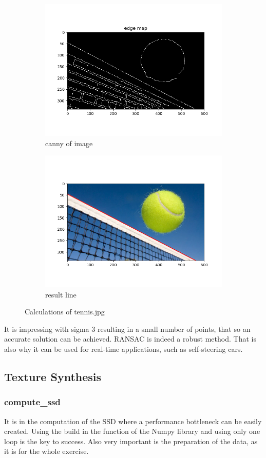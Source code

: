 \documentclass[12pt]{article}
\begin{document}
\begin{figure}[!htb]
  \vspace*{-1cm}
  \centering
  \begin{subfigure}{.5\textwidth}
    \centering
    \includegraphics[width=0.7\linewidth]{pics/hw3_ex_1_tennis_canny}
    \caption{canny of image}
  \end{subfigure}%
  \begin{subfigure}{.5\textwidth}
    \centering
    \includegraphics[width=0.7\linewidth]{pics/hw3_ex_1_tennis_result}
    \caption{result line}
   \end{subfigure}
  \caption{Calculations of tennis.jpg}
\end{figure}
\noindent It is impressing with sigma 3 resulting in a small number of points, that so an accurate solution can be achieved. RANSAC is indeed a robust method. That is also why it can be used for real-time applications, such as self-steering cars.
\newpage
\subsection{Texture Synthesis}

\subsubsection{compute\_ssd}
It is in the computation of the SSD where a performance bottleneck can be easily created. Using the build in the function of the Numpy library and using only one loop is the key to success. Also very important is the preparation of the data, as it is for the whole exercise.
\end{document}
